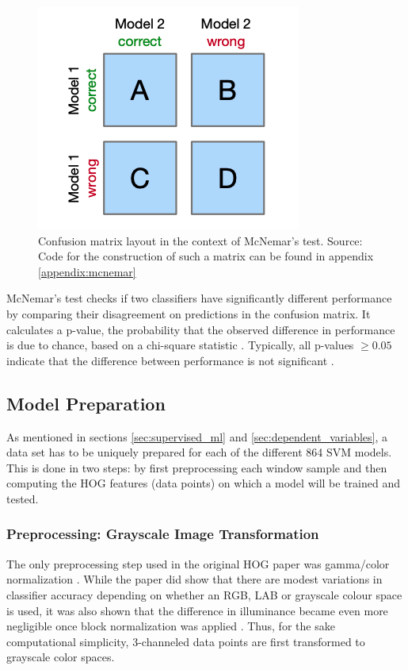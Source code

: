 \begin{figure}
    \centering
    \includegraphics[width=0.5\linewidth]{images/mcnemar_matrix.png}
    \caption{Confusion matrix layout in the context of McNemar's test. Source: \cite{raschka_2018_mcnemar} Code for the construction of such a matrix can be found in appendix \ref{appendix:mcnemar}}
    \label{fig:confusion_mcnemar}
\end{figure}

McNemar's test checks if two classifiers have significantly different performance by comparing their disagreement on predictions in the confusion matrix. It calculates a p-value, the probability that the observed difference in performance is due to chance, based on a chi-square statistic \cite{dietterich_1998_mcnemar}. Typically, all p-values $\ge 0.05$ indicate that the difference between performance is not significant \cite{raschka_2018_mcnemar} \cite{dietterich_1998_mcnemar}. 


\subsection{Model Preparation}

As mentioned in sections \ref{sec:supervised_ml} and \ref{sec:dependent_variables}, a data set has to be uniquely prepared for each of the different 864 SVM models. This is done in two steps: by first preprocessing each window sample and then computing the HOG features (data points) on which a model will be trained and tested.

\subsubsection{Preprocessing: Grayscale Image Transformation}

The only preprocessing step used in the original HOG paper was gamma/color normalization \cite{dalal_2005_histograms}. While the paper did show that there are modest variations in classifier accuracy depending on whether an RGB, LAB or grayscale colour space is used, it was also shown that the difference in illuminance became even more negligible once block normalization was applied \cite{dalal_2005_histograms}. Thus, for the sake computational simplicity, 3-channeled data points are first transformed to grayscale color spaces.

